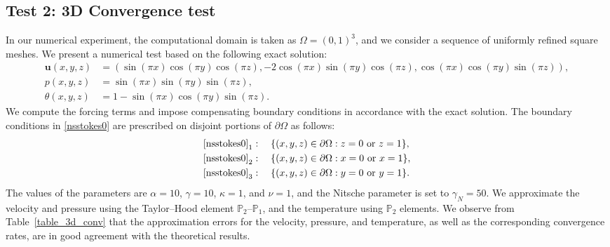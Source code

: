 \documentclass[10pt,a4paper]{article}
\begin{document}
\subsection{Test 2: 3D Convergence test}
In our numerical experiment, the computational domain is taken as $\Omega = (0, 1)^3$, and we consider a sequence
of uniformly refined square meshes. We present a numerical test based on the following exact solution:
\begin{align*}
\boldsymbol{u}(x,y,z)&=(\sin(\pi x) \cos(\pi y) \cos(\pi z),-2 \cos(\pi x) \sin(\pi y) \cos(\pi z), \cos(\pi x) \cos(\pi y) \sin(\pi z)), \\
p(x,y,z) & = \sin(\pi x) \sin(\pi y) \sin(\pi z), \\
\theta(x,y,z) & = 1-\sin(\pi x) \cos(\pi y) \sin(\pi z).
\end{align*}
We compute the forcing terms and impose compensating boundary conditions in accordance with the exact solution. The boundary conditions in \eqref{nsstokes0} are prescribed on disjoint portions of $\partial \Omega$ as follows:
\begin{align*}
\eqref{nsstokes0}_1 &:\quad \{ (x,y,z) \in \partial \Omega : z = 0 \text{ or } z = 1 \}, \\
\eqref{nsstokes0}_2 &:\quad \{ (x,y,z) \in \partial \Omega : x = 0 \text{ or } x = 1 \}, \\
\eqref{nsstokes0}_3 &:\quad \{ (x,y,z) \in \partial \Omega : y = 0 \text{ or } y = 1 \}.
\end{align*}
The values of the parameters are $\alpha = 10$, $\gamma = 10$, $\kappa = 1$, and $\nu = 1$, and the Nitsche parameter is set to $\gamma_N = 50$.
We approximate the velocity and pressure using the Taylor--Hood element $\mathbb{P}_2$--$\mathbb{P}_1$, and the temperature using $\mathbb{P}_2$ elements. We observe from Table~\ref{table_3d_conv} that the approximation errors for the velocity, pressure, and temperature, as well as the corresponding convergence rates, are in good agreement with the theoretical results.
\end{document}
